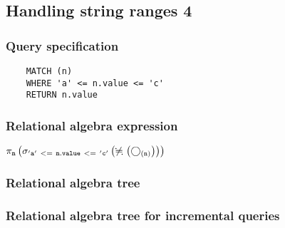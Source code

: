 	\subsection{Handling string ranges 4}

	\subsubsection*{Query specification}

	\begin{lstlisting}
	MATCH (n)
	WHERE 'a' <= n.value <= 'c'
	RETURN n.value
	\end{lstlisting}


	\subsubsection*{Relational algebra expression}

	$\projection{\var{n}} \left(\selection{\mathtt{'a'~<=~n.value~<=~'c'}} \left(\alldifferent{} \left(\getvertices{n}{}\right)\right)\right)$

	\subsubsection*{Relational algebra tree}


	\subsubsection*{Relational algebra tree for incremental queries}

